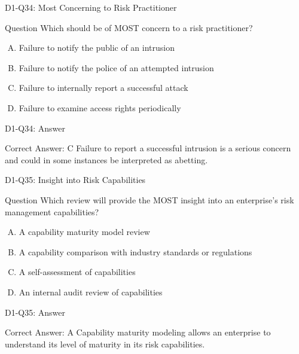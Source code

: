 \documentclass{beamer}
\begin{document}
	\begin{frame}{D1-Q34: Most Concerning to Risk Practitioner}
		\begin{block}{Question}
			Which should be of MOST concern to a risk practitioner?
		\end{block}
		\begin{enumerate}[(A)]
			\item Failure to notify the public of an intrusion
			\item Failure to notify the police of an attempted intrusion
			\item Failure to internally report a successful attack
			\item Failure to examine access rights periodically
		\end{enumerate}
	\end{frame}
	\begin{frame}{D1-Q34: Answer}
		\begin{block}{Correct Answer: C}
			Failure to report a successful intrusion is a serious concern and could in some instances be interpreted as abetting.
		\end{block}
	\end{frame}
	
	\begin{frame}{D1-Q35: Insight into Risk Capabilities}
		\begin{block}{Question}
			Which review will provide the MOST insight into an enterprise's risk management capabilities?
		\end{block}
		\begin{enumerate}[(A)]
			\item A capability maturity model review
			\item A capability comparison with industry standards or regulations
			\item A self-assessment of capabilities
			\item An internal audit review of capabilities
		\end{enumerate}
	\end{frame}
	\begin{frame}{D1-Q35: Answer}
		\begin{block}{Correct Answer: A}
			Capability maturity modeling allows an enterprise to understand its level of maturity in its risk capabilities.
		\end{block}
	\end{frame}
	
\end{document}
